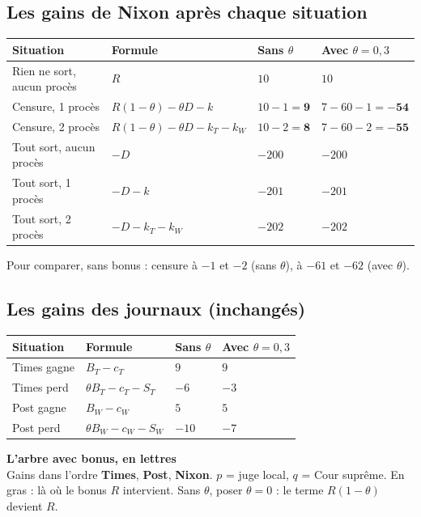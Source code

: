 \documentclass[11pt,a4paper]{article}
\theoremstyle{definition}
\newcommand{\T}[1]{\textcolor{nyt}{#1}}
\newcommand{\W}[1]{\textcolor{wp}{#1}}
\begin{document}
\subsection{Les gains de Nixon après chaque situation}
\begin{center}
\small
\begin{tabular}{@{}llll@{}}
\toprule
Situation & Formule & Sans $\theta$ & Avec $\theta=0,3$ \\
\midrule
Rien ne sort, aucun procès & $R$ & $10$ & $10$ \\
Censure, 1 procès & $R(1-\theta)-\theta D-k$ & $10-1=\mathbf{9}$ & $7-60-1=\mathbf{-54}$ \\
Censure, 2 procès & $R(1-\theta)-\theta D-k_T-k_W$ & $10-2=\mathbf{8}$ & $7-60-2=\mathbf{-55}$ \\
Tout sort, aucun procès & $-D$ & $-200$ & $-200$ \\
Tout sort, 1 procès & $-D-k$ & $-201$ & $-201$ \\
Tout sort, 2 procès & $-D-k_T-k_W$ & $-202$ & $-202$ \\
\bottomrule
\end{tabular}
\end{center}
Pour comparer, sans bonus : censure à $-1$ et $-2$ (sans $\theta$), à $-61$ et $-62$ (avec $\theta$).

\subsection{Les gains des journaux (inchangés)}
\begin{center}
\small
\begin{tabular}{@{}llll@{}}
\toprule
Situation & Formule & Sans $\theta$ & Avec $\theta=0,3$ \\
\midrule
\T{Times gagne} & $B_T-c_T$ & $9$ & $9$ \\
\T{Times perd} & $\theta B_T-c_T-S_T$ & $-6$ & $-3$ \\
\W{Post gagne} & $B_W-c_W$ & $5$ & $5$ \\
\W{Post perd} & $\theta B_W-c_W-S_W$ & $-10$ & $-7$ \\
\bottomrule
\end{tabular}
\end{center}

\begin{landscape}
\begin{center}{\large\bfseries L'arbre avec bonus, en lettres}\\[2pt]{\small Gains dans l'ordre \textcolor{nyt}{\textbf{Times}}, \textcolor{wp}{\textbf{Post}}, \textcolor{gov}{\textbf{Nixon}}. $p$ = juge local, $q$ = Cour suprême. En gras : là où le bonus $R$ intervient. Sans $\theta$, poser $\theta=0$ : le terme $R(1-\theta)$ devient $R$.}\end{center}\vspace{-4pt}
\noindent\resizebox{\linewidth}{!}{}
\end{landscape}
\end{document}
